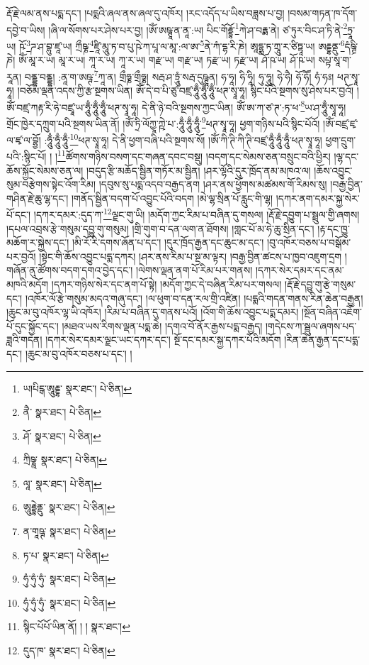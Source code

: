རྡོ་རྗེ་ལམ་ནས་པདྨ་དང་། །པདྨའི་ཞལ་ནས་ཞལ་དུ་འཁོར། །རང་འདོད་པ་ཡིས་བཟླས་པ་བྱ། །བསམ་གཏན་ཁ་དོག་དབྱེ་བ་ཡིས། །ཞི་ལ་སོགས་པར་ཤེས་པར་བྱ། །ཨོཾ་ཨཥྚཱ་ན་ནཱ་:ཡ། པིང་གོརྡྷོ་\footnote{ཡ།པིངྒ་ཨཱུརྡྷ་  སྣར་ཐང་།  པེ་ཅིན། }ཀེ་ཤ་བརྟྨ་ནེ། ཙ་ཏུར་བིང་ཤ་ཏི་ནེ་\footnote{ནཻ་  སྣར་ཐང་།  པེ་ཅིན། }ཏྲཱ་ཡ། ཥོ་\footnote{ཤོ་  སྣར་ཐང་།  པེ་ཅིན། }ཌ་ཤ་བྷུ་ཛཱ་ཡ། ཀྲྀཥྞ་\footnote{ཀྲིཥྞཱ་  སྣར་ཐང་།  པེ་ཅིན། }ཛཱི་མཱུ་ཏ་བ་པུ་ཥེ་ཀ་པཱ་ལ་མཱ་:ལ་ཨ་\footnote{ལཱ་  སྣར་ཐང་།  པེ་ཅིན། }ནེ་ཀཾ་དྷ་རི་ཎེ། ཨཱདྷྨ་ཏ་ཀྲཱུ་ར་ཙིཏྟཱ་ཡ། ཨརྡྷནྡུ་\footnote{ཨཱུརྡྷེནྡུ་  སྣར་ཐང་།  པེ་ཅིན། }དཾཥྚྲི་ཎེ། ཨོཾ་མཱ་ར་ཡ། མཱ་ར་ཡ། ཀཱ་ར་ཡ། ཀཱ་ར་ཡ། གརྫ་ཡ། གརྫ་ཡ། ཏརྫ་ཡ། ཏརྫ་ཡ། ཤོ་ཥ་ཡ། ཤོ་ཥ་ཡ། སཔྟ་སཱ་ག་རཱན། བནྡྷ་བནྡྷ། :ནཱ་ག་ཨཥྚ་\footnote{ན་གཱཥྚ་  སྣར་ཐང་།  པེ་ཅིན། }ཀཱ་ན། གྲྀཧྞ་གྲྀཧྞ། སརྦ་ཤ་ཏྲཱུཾ་སརྦ་དུཥྚཱན། ཧ་ཧཱ། ཧི་ཧཱི། ཧུ་ཧཱུ། ཧེ་ཧཻ། ཧོ་ཧཽ། ཧཾ་ཧཿ། ཕཊ་སྭཱ་ཧཱ། །བཅོམ་ལྡན་འདས་ཀྱི་རྩ་སྔགས་ཡིན། ཨོཾ་དེ་བ་པི་ཙུ་བཛྲ་ཧཱུྃ་ཧཱུྃ་ཧཱུྃ་ཕཊ་སྭཱ་ཧཱ། སྙིང་པོའི་སྔགས་སུ་ཤེས་པར་བྱའོ། །ཨོཾ་བཛྲ་ཀརྟ་རི་ཧེ་བཛྲཱ་ཡ་ཧཱུྃ་ཧཱུྃ་ཧཱུྃ་ཕཊ་སྭཱ་ཧཱ། དེ་ནི་ཉེ་བའི་སྔགས་ཀྱང་ཡིན། ཨོཾ་ཨ་ཀ་ཙ་ཊ་:ཏ་ཕ་\footnote{ཏ་པ་  སྣར་ཐང་།  པེ་ཅིན། }ཡ་ཤ་ཧཱུྃ་སྭཱ་ཧཱ། གྲོང་ཁྱེར་དཀྲུག་པའི་སྔགས་ཡིན་ནོ། །ཨོཾ་ཏྲི་ལོཀྱཱ་ཀྵེ་པ་:ཧཱུྃ་ཧཱུྃ་ཧཱུྃ་\footnote{ཧུཾ་ཧུཾ་ཧུཾ་  སྣར་ཐང་།  པེ་ཅིན། }ཕཊ་སྭཱ་ཧཱ། ཕྱག་གཉིས་པའི་སྙིང་པོའོ། །ཨོཾ་བཛྲ་ཛྭ་ལ་ཛྭ་ལ་བྷྱོ། :ཧཱུྃ་ཧཱུྃ་ཧཱུྃ་\footnote{ཧུཾ་ཧུཾ་ཧུཾ་  སྣར་ཐང་།  པེ་ཅིན། }ཕཊ་སྭཱ་ཧཱ། དེ་ནི་ཕྱག་བཞི་པའི་སྔགས་སོ། །ཨོཾ་ཀི་ཊི་ཀི་ཊི་བཛྲ་ཧཱུྃ་ཧཱུྃ་ཧཱུྃ་ཕཊ་སྭཱ་ཧཱ། ཕྱག་དྲུག་པའི་:སྙིང་པོ། ། །\footnote{སྙིང་པོཔོ་ཡིན་ནོ། ། །  སྣར་ཐང་། }ཚོགས་གཉིས་བསག་དང་གཞན་དབང་བསྡུ། །བདག་དང་སེམས་ཅན་བསྲུང་བའི་ཕྱིར། །ལྷ་དང་ཆོས་སྐྱོང་སེམས་ཅན་ལ། །བདུད་རྩི་མཆོད་སྦྱིན་གཏོར་མ་སྦྱིན། །ཤར་ལྷོའི་དུར་ཁྲོད་ནམ་མཁའ་ལ། །ཆོས་འབྱུང་སུམ་བརྩེགས་སྟེང་འོག་རིམ། །དབུས་སུ་པདྨ་འདབ་བརྒྱད་ནག །ཤར་ནས་ཕྱོགས་མཚམས་གོ་རིམས་སུ། །བརྒྱ་བྱིན་གཤིན་རྗེ་ཆུ་ལྷ་དང་། །གནོད་སྦྱིན་བདག་པོ་འབྱུང་པོའི་བདག །མེ་ལྷ་སྲིན་པོ་རླུང་གི་ལྷ། །དཀར་ནག་དམར་སྐྱ་སེར་པོ་དང་། །དཀར་དམར་:དུད་ཀ་\footnote{དུད་ཁ་  སྣར་ཐང་།  པེ་ཅིན། }ལྗང་གུ་ཡི། །མདོག་ཀྱང་རིམ་པ་བཞིན་དུ་གསལ། །རྡོ་རྗེ་དབྱུག་པ་སྦྲུལ་གྱི་ཞགས། །དཔལ་འབྲས་རྩེ་གསུམ་དབྱུ་གུ་གསུམ། །གྲི་གུག་བ་དན་ལག་ན་ཐོགས། །གླང་པོ་མ་ཧེ་ཆུ་སྲིན་དང་། །རྟ་དང་ཁྱུ་མཆོག་ར་སྐྱེས་དང་། །མི་རོ་རི་དགས་ཞོན་པ་དང་། །དུར་ཁྲོད་རྒྱན་དང་ཆུང་མ་དང་། །བུ་འཁོར་བཅས་པ་བསྒོམ་པར་བྱའོ། །སྟེང་གི་ཆོས་འབྱུང་པདྨ་དཀར། །ཤར་ནས་རིམ་པ་སྔ་མ་ལྟར། །བརྒྱ་བྱིན་ཚངས་པ་ཁྱབ་འཇུག་དྲག །གཞོན་ནུ་ཚོགས་བདག་དགའ་བྱེད་དང་། །ལེགས་ལྡན་ནག་པོ་རིམ་པར་གནས། །དཀར་སེར་དམར་དང་ནམ་མཁའི་མདོག །དཀར་གཉིས་སེར་དང་ནག་པོ་སྟེ། །མདོག་ཀྱང་དེ་བཞིན་རིམ་པར་གསལ། །རྡོ་རྗེ་དབྱུ་གུ་རྩེ་གསུམ་དང་། །འཁོར་ལོ་རྩེ་གསུམ་མདའ་གཞུ་དང་། །ལ་ཕུག་བ་དན་རལ་གྲི་འཛིན། །པདྨའི་གདན་གནས་རིན་ཆེན་བརྒྱན། །ཆུང་མ་བུ་འཁོར་ལྷ་ཡི་འཁོར། །རིམ་པ་བཞིན་དུ་གནས་པའོ། །འོག་གི་ཆོས་འབྱུང་པདྨ་དམར། །སྔོན་བཞིན་འཇོག་པོ་དུང་སྐྱོང་དང་། །མཐའ་ཡས་རིགས་ལྡན་པདྨ་ཆེ། །དགའ་བོ་ནོར་རྒྱས་པདྨ་བརྒྱད། །གདེངས་ཀ་སྦྲུལ་ཞགས་པད་ཟླའི་གདན། །དཀར་སེར་དམར་ལྗང་ཡང་དཀར་དང་། སྔོ་དང་དམར་སྐྱ་དཀར་པོའི་མདོག །རིན་ཆེན་རྒྱན་དང་པདྨ་དང་། །ཆུང་མ་བུ་འཁོར་བཅས་པ་དང་། །
